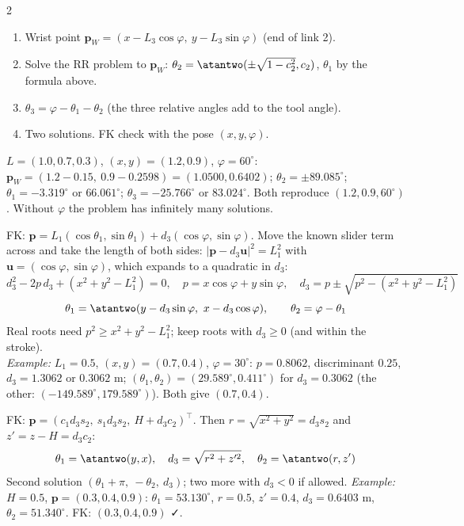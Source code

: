 \begin{multicols}{2}
\begin{recipe}
\label{w3:rrr}
\begin{enumerate}
\item Wrist point $\mathbf p_W=(x-L_3\cos\varphi,\ y-L_3\sin\varphi)$ (end of link 2).
\item Solve the RR problem to $\mathbf p_W$: $\theta_2=\atantwo(\pm\sqrt{1-c_2^2},c_2)$, $\theta_1$ by the formula above.
\item $\theta_3=\varphi-\theta_1-\theta_2$ (the three relative angles add to the tool angle).
\item Two solutions. FK check with the pose $(x,y,\varphi)$.
\end{enumerate}
\end{recipe}
\begin{worked}[RRR]
$L=(1.0,0.7,0.3)$, $(x,y)=(1.2,0.9)$, $\varphi=60^\circ$: $\mathbf p_W=(1.2-0.15,\ 0.9-0.2598)=(1.0500,0.6402)$; $\theta_2=\pm89.085^\circ$; $\theta_1=-3.319^\circ$ or $66.061^\circ$; $\theta_3=-25.766^\circ$ or $83.024^\circ$. Both reproduce $(1.2,0.9,60^\circ)$. Without $\varphi$ the problem has infinitely many solutions. \chk
\end{worked}
FK: $\mathbf p=L_1(\cos\theta_1,\sin\theta_1)+d_3(\cos\varphi,\sin\varphi)$. Move the known slider term across and take the length of both sides: $|\mathbf p-d_3\mathbf u|^2=L_1^2$ with $\mathbf u=(\cos\varphi,\sin\varphi)$, which expands to a quadratic in $d_3$:
\[d_3^2-2p\,d_3+(x^2+y^2-L_1^2)=0,\quad p=x\cos\varphi+y\sin\varphi,\quad d_3=p\pm\sqrt{p^2-(x^2+y^2-L_1^2)}\]
\[\theta_1=\atantwo(y-d_3\sin\varphi,\ x-d_3\cos\varphi),\qquad \theta_2=\varphi-\theta_1\]
Real roots need $p^2\ge x^2+y^2-L_1^2$; keep roots with $d_3\ge0$ (and within the stroke).\\
\textit{Example:} $L_1=0.5$, $(x,y)=(0.7,0.4)$, $\varphi=30^\circ$: $p=0.8062$, discriminant $0.25$, $d_3=1.3062$ or $0.3062$ m; $(\theta_1,\theta_2)=(29.589^\circ,0.411^\circ)$ for $d_3=0.3062$ (the other: $(-149.589^\circ,179.589^\circ)$). Both give $(0.7,0.4)$. \chk

FK: $\mathbf p=(c_1d_3s_2,\ s_1d_3s_2,\ H+d_3c_2)^\top$. Then $r=\sqrt{x^2+y^2}=d_3s_2$ and $z'=z-H=d_3c_2$:
\[\theta_1=\atantwo(y,x),\quad d_3=\sqrt{r^2+z'^2},\quad \theta_2=\atantwo(r,z')\]
Second solution $(\theta_1+\pi,\ -\theta_2,\ d_3)$; two more with $d_3<0$ if allowed. \textit{Example:} $H=0.5$, $\mathbf p=(0.3,0.4,0.9)$: $\theta_1=53.130^\circ$, $r=0.5$, $z'=0.4$, $d_3=0.6403$ m, $\theta_2=51.340^\circ$. FK: $(0.3,0.4,0.9)$ ✓. \chk


\end{multicols}
